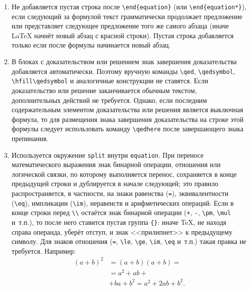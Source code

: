 \begin{enumerate}
    \item {}
        Не добавляется пустая строка после \verb|\end{equation}| (или \verb|\end{equation*}|), если следующий за формулой текст грамматически продолжает предложение или представляет следующее предложение того же самого абзаца (иначе LaTeX начнёт новый абзац с красной строки).
        Пустая строка добавляется только если после формулы начинается новый абзац.

    \item {}
        В блоках с доказательством или решением знак завершения доказательства добавляется автоматически.
        Поэтому вручную команды \verb|\qed|, \verb|\qedsymbol|, \verb|\hfill\qedsymbol| и аналогичные конструкции не ставятся.
        Если доказательство или решение заканчивается обычным текстом, дополнительных действий не требуется.
        Однако, если последним содержательным элементом доказательства или решения является выключная формула, то для размещения знака завершения доказательства на строке этой формулы следует использовать команду \verb|\qedhere| после завершающего знака препинания.

    \item {}
        Используется окружение \verb|split| внутри \verb|equation|.
        При переносе математического выражения знак бинарной операции, отношения или логической связки, по которому выполняется перенос, сохраняется в конце предыдущей строки и дублируется в начале следующей; это правило распространяется, в частности, на знаки равенства (\verb|=|), эквивалентности (\verb|\eq|), импликации (\verb|\im|), неравенств и арифметических операций.
        Если в конце строки перед \verb|\\| остаётся знак бинарной операции (\verb|+|, \verb|-|, \verb|\pm|, \verb|\mul| и~т.п.), то после него ставится пустая группа \verb|{}|: иначе TeX, не находя справа операнда, уберёт отступ, и знак <<прилипнет>> к предыдущему символу.
        Для знаков отношения (\verb|=|, \verb|\le|, \verb|\ge|, \verb|\im|, \verb|\eq| и~т.п.) такая правка не требуется.
        Например:
        \begin{equation*}
            \begin{split}
                (a + b)^2 
                    & = (a+b)(a+b) = \\
                    & = a^2 + ab + {} \\
                    & + ba + b^2 = a^2 + 2ab + b^2.
            \end{split}
        \end{equation*}


\end{enumerate}
